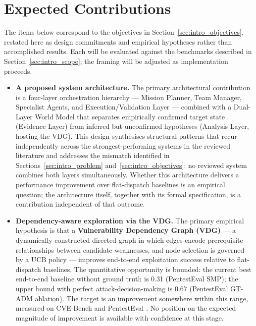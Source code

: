\section{Expected Contributions}
\label{sec:intro_contributions}

The items below correspond to the objectives in Section~\ref{sec:intro_objectives}, restated here as design commitments and empirical hypotheses rather than accomplished results. Each will be evaluated against the benchmarks described in Section~\ref{sec:intro_scope}; the framing will be adjusted as implementation proceeds.

\begin{itemize}
	\item \textbf{A proposed system architecture.} The primary architectural contribution is a four-layer orchestration hierarchy --- Mission Planner, Team Manager, Specialist Agents, and Execution/Validation Layer --- combined with a Dual-Layer World Model that separates empirically confirmed target state (Evidence Layer) from inferred but unconfirmed hypotheses (Analysis Layer, hosting the VDG). This design synthesises structural patterns that recur independently across the strongest-performing systems in the reviewed literature \citep{zhu2024hptsa,kong2025vulnbot,singer2025incalmo} and addresses the mismatch identified in Sections~\ref{sec:intro_problem} and~\ref{sec:intro_objectives}: no reviewed system combines both layers simultaneously. Whether this architecture delivers a performance improvement over flat-dispatch baselines is an empirical question; the architecture itself, together with its formal specification, is a contribution independent of that outcome.

	\item \textbf{Dependency-aware exploration via the VDG.} The primary empirical hypothesis is that a \textbf{Vulnerability Dependency Graph (VDG)} --- a dynamically constructed directed graph in which edges encode prerequisite relationships between candidate weaknesses, and node selection is governed by a UCB policy --- improves end-to-end exploitation success relative to flat-dispatch baselines. The quantitative opportunity is bounded: the current best end-to-end baseline without ground truth is 0.31 (PentestEval SMP); the upper bound with perfect attack-decision-making is 0.67 (PentestEval GT-ADM ablation). The target is an improvement somewhere within this range, measured on CVE-Bench \citep{zhu2025cvebench} and PentestEval \citep{yang2025pentesteval}. No position on the expected magnitude of improvement is available with confidence at this stage.


\end{itemize}
